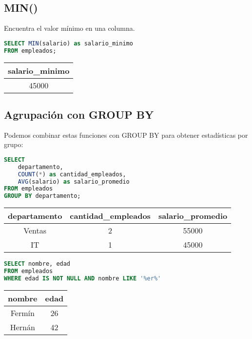 \documentclass[12pt]{article}
\begin{document}
\subsection{MIN()}
Encuentra el valor mínimo en una columna.

\begin{lstlisting}[language=SQL]
SELECT MIN(salario) as salario_minimo
FROM empleados;
\end{lstlisting}

\begin{center}
\begin{tabular}{c}
\toprule
salario\_minimo \\
\midrule
45000 \\
\bottomrule
\end{tabular}
\end{center}

\subsection{Agrupación con GROUP BY}
Podemos combinar estas funciones con GROUP BY para obtener estadísticas por grupo:

\begin{lstlisting}[language=SQL]
SELECT 
    departamento,
    COUNT(*) as cantidad_empleados,
    AVG(salario) as salario_promedio
FROM empleados
GROUP BY departamento;
\end{lstlisting}

\begin{center}
\begin{tabular}{ccc}
\toprule
departamento & cantidad\_empleados & salario\_promedio \\
\midrule
Ventas & 2 & 55000 \\
IT & 1 & 45000 \\
\bottomrule
\end{tabular}
\end{center}

\begin{lstlisting}[language=SQL]
SELECT nombre, edad
FROM empleados
WHERE edad IS NOT NULL AND nombre LIKE '%er%'
\end{lstlisting}

\begin{center}
\begin{tabular}{cc}
\toprule
nombre & edad \\
\midrule
Fermín & 26 \\
Hernán & 42 \\
\bottomrule
\end{tabular}
\end{center}
\end{document}
